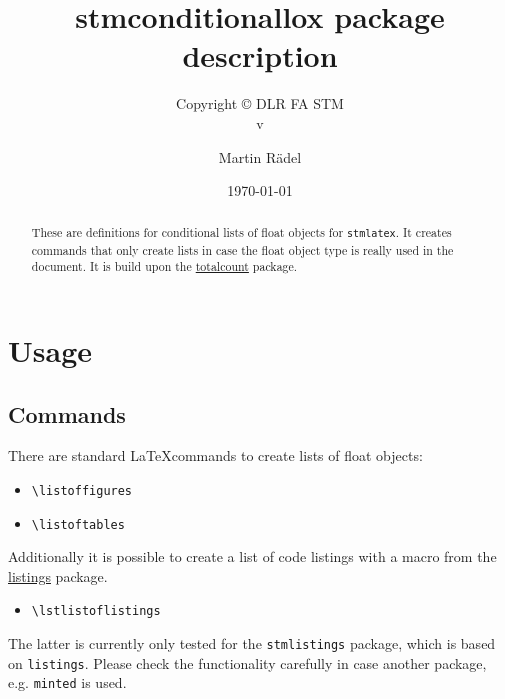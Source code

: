 \documentclass[%
  type=article,%
  layout=koma,%
  hyperref=true,%
  conditionallox=false,%
  date=true,%
  listings=true%
]{stmtext}
\author{Martin R\"{a}del}
\title{stmconditionallox package description}
\subtitle{Copyright \copyright{} \the\year{} DLR FA STM\\v\formatdate[versiondatestyle]{\DTMToday}}
\date{\today}
\begin{document}
\maketitle

\begin{abstract}
These are definitions for conditional lists of float objects for \texttt{stmlatex}. It creates commands that only create lists in case the float object type is really used in the document. It is build upon the \href{https://ctan.org/pkg/totalcount}{totalcount} package.
\end{abstract}

\tableofcontents

\conditionallistoffigures  %
\conditionallistoftables   %
\conditionallistoflistings %

\section{Usage}

\subsection{Commands}

There are standard \LaTeX commands to create lists of float objects:

\begin{itemize}
  \item \verb+\listoffigures+
  \item \verb+\listoftables+
\end{itemize}

Additionally it is possible to create a list of code listings with a macro from the \href{https://ctan.org/pkg/listings}{listings} package.

\begin{itemize}
  \item \verb+\lstlistoflistings+
\end{itemize}

The latter is currently only tested for the \texttt{stmlistings} package, which is based on \texttt{listings}. Please check the functionality carefully in case another package, e.g. \texttt{minted} is used.
\end{document}
